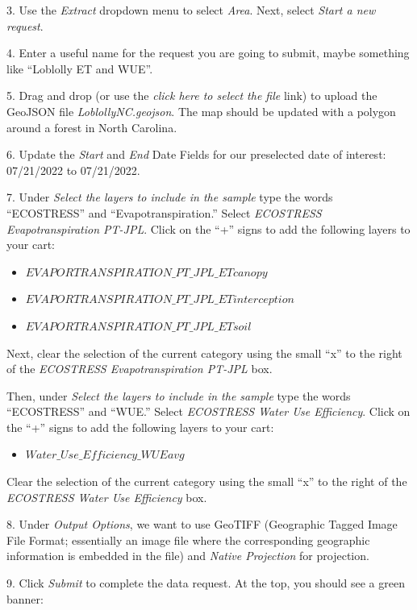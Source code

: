 \documentclass[oneside,a4paper,11pt,explicit]{book}
\begin{document}
3. Use the \textit{Extract} dropdown menu to select \textit{Area}. Next, select \textit{ Start a new request}. 

4. Enter a useful name for the request you are going to submit, maybe something like ``Loblolly ET and WUE''. 

5. Drag and drop (or use the \textit{click here to select the file} link) to upload the GeoJSON file \textit{LoblollyNC.geojson}. The map should be updated with a polygon around a forest in North Carolina.

6. Update the \textit{Start} and \textit{End} Date Fields for our preselected date of interest: 07/21/2022 to 07/21/2022.

7. Under \textit{Select the layers to include in the sample} type the words ``ECOSTRESS'' and ``Evapotranspiration.'' Select \textit{ECOSTRESS Evapotranspiration PT-JPL}. Click on the ``+'' signs to add the following layers to your cart: 

\begin{itemize}
	\item $EVAPORTRANSPIRATION\_PT\_JPL\_ETcanopy$
	\item $EVAPORTRANSPIRATION\_PT\_JPL\_ETinterception$
	\item $EVAPORTRANSPIRATION\_PT\_JPL\_ETsoil$
\end{itemize}

Next, clear the selection of the current category using the small ``x'' to the right of the \textit{ECOSTRESS Evapotranspiration PT-JPL} box.

Then, under \textit{Select the layers to include in the sample} type the words ``ECOSTRESS'' and ``WUE.'' Select \textit{ECOSTRESS Water Use Efficiency}. Click on the ``+'' signs to add the following layers to your cart: 

\begin{itemize}
	\item $Water\_Use\_Efficiency\_WUEavg$
\end{itemize}

Clear the selection of the current category using the small ``x'' to the right of the \textit{ECOSTRESS Water Use Efficiency} box.

8. Under \textit{Output Options}, we want to use GeoTIFF (Geographic Tagged Image File Format; essentially an image file where the corresponding geographic information is embedded in the file) and \textit{Native Projection} for projection.

9. Click \textit{Submit} to complete the data request. At the top, you should see a green banner:
\end{document}
